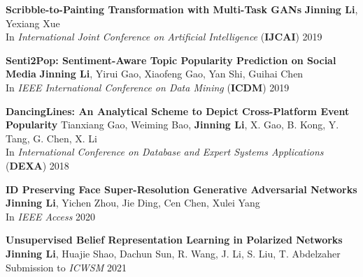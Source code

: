 \documentclass[12pt, letterpaper]{article}
\newenvironment{itemize*}%
{\begin{itemize}%
  \setlength{\itemsep}{0pt}}%
{\end{itemize}}
\newcommand{\mhead}[1]{\leavevmode\marginpar{\sffamily\footnotesize #1}}
\newcommand{\rdate}[1]{{\addfontfeature{Numbers=OldStyle} \hfill #1}}
\begin{document}

\medskip
\mhead{Publications}%
\normalsize
\textbf{Scribble-to-Painting Transformation with Multi-Task GANs}\href{https://www.ijcai.org/proceedings/2019/820}{}\href{https://github.com/jinningli/DSP-Net}{}\newline
\small{\textbf{Jinning Li}, Yexiang Xue}\\
\small{In \emph{International Joint Conference on Artificial Intelligence} (\textbf{IJCAI}) 2019}

\normalsize
\textbf{Senti2Pop: Sentiment-Aware Topic Popularity Prediction on Social Media}\href{http://jinningli.cn/cv/Senti2Pop.pdf}{}\newline
\small{\textbf{Jinning Li}, Yirui Gao, Xiaofeng Gao, Yan Shi, Guihai Chen}\\
\small{In \emph{IEEE International Conference on Data Mining} (\textbf{ICDM}) 2019}

\normalsize
\textbf{D\small{ancing}L\small{ines}: An Analytical Scheme to Depict Cross-Platform Event Popularity}\href{http://jinningli.cn/cv/dancinglines.pdf}{}\href{https://github.com/jinningli/dancinglines}{}\newline
\small{Tianxiang Gao, Weiming Bao, \textbf{Jinning Li}, X. Gao, B. Kong, Y. Tang, G. Chen, X. Li}\\
\small{In \emph{International Conference on Database and Expert Systems Applications} (\textbf{DEXA}) 2018}

\normalsize
\textbf{ID Preserving Face Super-Resolution Generative Adversarial Networks}\href{https://ieeexplore.ieee.org/document/9146819}{}\href{https://github.com/jinningli/IP-FSRGAN}{}\newline
\small{\textbf{Jinning Li}, Yichen Zhou, Jie Ding, Cen Chen, Xulei Yang}\\
\small{In \emph{IEEE Access} 2020}

\mhead{Manuscripts}%
\normalsize
\textbf{Unsupervised Belief Representation Learning in Polarized Networks}\newline
\small{\textbf{Jinning Li}, Huajie Shao, Dachun Sun, R. Wang, J. Li, S. Liu, T. Abdelzaher}\\
\small{Submission to \emph{ICWSM} 2021}
\end{document}
